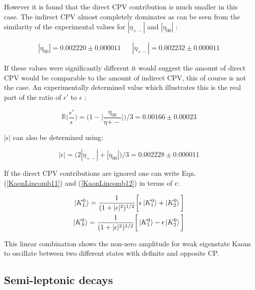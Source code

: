 \noindent However it is found that the direct CPV contribution is much smaller in this case. The indirect CPV almost completely dominates as can be seen from the similarity of the experimental values for $|\eta_{+-}|$ and $|\eta_{00}|$ \cite{PDGKaons}:

\begin{align*}
|\eta_{00}| = 0.002220 \pm 0.000011 &  & |\eta_{+-}| = 0.002232 \pm 0.000011 
\end{align*}  

\noindent If these values were significantly different it would suggest the amount of direct CPV would be comparable to the amount of indirect CPV, this of course is not the case. An experimentally determined value which illustrates this is the real part of the ratio of $\epsilon'$ to $\epsilon$ \cite{PDGKaons}:

\begin{equation*}
\mathbb{R} \bigg(\frac{\epsilon'}{\epsilon} \bigg)  = \bigg(1 - \bigg|\frac{\eta_{00}}{\eta{+-}}\bigg|\bigg) / 3 = 0.00166 \pm 0.00023
\end{equation*}

\smallskip

\noindent $|\epsilon|$ can also be determined using:

\begin{equation*} 
|\epsilon| = \big(2 |\eta_{+-}| + |\eta_{00}|\big)/3 = 0.002228 \pm 0.000011
\end{equation*} 

\smallskip

\noindent If the direct CPV contributions are ignored one can write Eqn.(\ref{KaonLincomb11}) and (\ref{KaonLincomb12}) in terms of $\epsilon$:

\begin{align}
\label{KaonLincomb21}
\ket{K^{0}_{L}} = \frac{1}{(1+|\epsilon|^2)^{1/2}} \bigg[ \epsilon \ket{K^{0}_{1}} + \ket{K^{0}_{2}}\bigg] \\
\label{KaonLincomb22}
\ket{K^{0}_{S}} = \frac{1}{(1+|\epsilon|^2)^{1/2}} \bigg[ \ket{K^{0}_{1}} - \epsilon \ket{K^{0}_{2}}\bigg]
\end{align}

\smallskip

\noindent This linear combination shows the non-zero amplitude for weak eigenstate Kaons to oscillate between two different states with definite and opposite CP.

\subsection{Semi-leptonic decays}\label{Kevin:Kaon_semileptonic}

